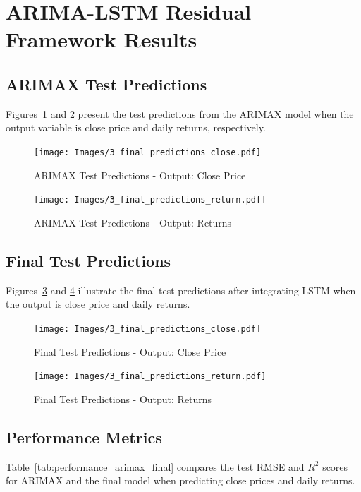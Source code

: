 \section{ARIMA-LSTM Residual Framework Results}

\subsection{ARIMAX Test Predictions}
Figures~\ref{fig:arimax_close} and \ref{fig:arimax_returns} present the test predictions from the ARIMAX model when the output variable is close price and daily returns, respectively.

\begin{figure}[h!]
    \centering
    \texttt{[image: Images/3\_final\_predictions\_close.pdf]}
    \caption{ARIMAX Test Predictions - Output: Close Price}
    \label{fig:arimax_close}
\end{figure}

\begin{figure}[h!]
    \centering
    \texttt{[image: Images/3\_final\_predictions\_return.pdf]}
    \caption{ARIMAX Test Predictions - Output: Returns}
    \label{fig:arimax_returns}
\end{figure}

\subsection{Final Test Predictions}
Figures~\ref{fig:final_close} and \ref{fig:final_returns} illustrate the final test predictions after integrating LSTM when the output is close price and daily returns.

\begin{figure}[h!]
    \centering
    \texttt{[image: Images/3\_final\_predictions\_close.pdf]}
    \caption{Final Test Predictions - Output: Close Price}
    \label{fig:final_close}
\end{figure}

\begin{figure}[h!]
    \centering
    \texttt{[image: Images/3\_final\_predictions\_return.pdf]}
    \caption{Final Test Predictions - Output: Returns}
    \label{fig:final_returns}
\end{figure}

\subsection{Performance Metrics}
Table~\ref{tab:performance_arimax_final} compares the test RMSE and \( R^2 \) scores for ARIMAX and the final model when predicting close prices and daily returns.

